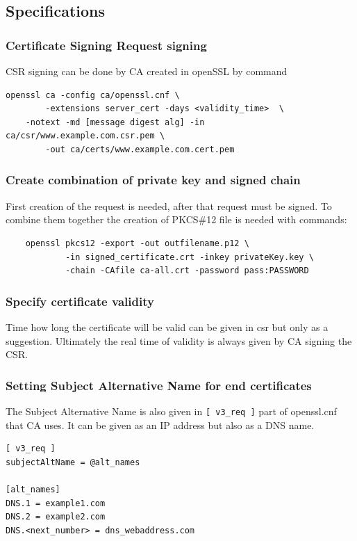 \documentclass[10pt, a4paper]{report}
\begin{document}
  \subsection{Specifications}
  
    \subsubsection{Certificate Signing Request signing}
CSR signing can be done by CA created in openSSL by command
\begin{verbatim}
openssl ca -config ca/openssl.cnf \
        -extensions server_cert -days <validity_time>  \
	-notext -md [message digest alg] -in ca/csr/www.example.com.csr.pem \
        -out ca/certs/www.example.com.cert.pem
\end{verbatim}

    \subsubsection{Create combination of private key and signed chain}
    First creation of the request is needed, after that request must be signed. To combine them together the creation of PKCS\#12 file is needed with commands:
\begin{verbatim}
	openssl pkcs12 -export -out outfilename.p12 \
	        -in signed_certificate.crt -inkey privateKey.key \
	        -chain -CAfile ca-all.crt -password pass:PASSWORD
\end{verbatim}
    \subsubsection{Specify certificate validity}
    Time how long the certificate will be valid can be given in csr but only as a suggestion. Ultimately the real time of validity is always given by CA signing the CSR.
    \subsubsection{Setting Subject Alternative Name for end certificates}
    The Subject Alternative Name is also given in \verb+[ v3_req ]+ part of openssl.cnf that CA uses. It can be given as an IP address but also as a DNS name.

\begin{verbatim}
[ v3_req ]
subjectAltName = @alt_names

[alt_names]
DNS.1 = example1.com
DNS.2 = example2.com
DNS.<next_number> = dns_webaddress.com
\end{verbatim}
\end{document}
